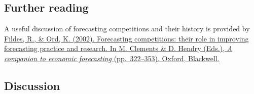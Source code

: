 \documentclass[11pt,a4paper,]{article}
\begin{document}
\hypertarget{further-reading}{%
\subsection{Further reading}\label{further-reading}}

A useful discussion of forecasting competitions and their history is provided by \href{https://doi.org/10.1002/9780470996430.ch15}{Fildes, R., \& Ord, K. (2002). Forecasting competitions: their role in improving forecasting practice and research. In M. Clements \& D. Hendry (Eds.), \emph{A companion to economic forecasting} (pp.~322--353). Oxford, Blackwell.}

\hypertarget{discussion}{%
\subsection{Discussion}\label{discussion}}
\end{document}
